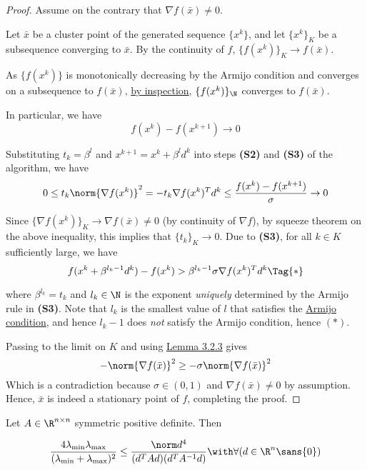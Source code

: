 \begin{proof}
  \def\xk{\{x^k\}}
  \def\grad#1{\nabla f(#1)}
  Assume on the contrary that $\grad{\bar x}\neq0$.

  Let $\bar x$ be a cluster point of the generated sequence $\xk$, and let
  $\xk_K$ be a subsequence converging to $\bar x$. By the continuity of $f$,
  $\{f(x^k)\}_K\to f(\bar x)$.

  As $\{f(x^k)\}$ is monotonically decreasing by the Armijo condition and
  converges on a subsequence to $f(\bar x)$, \href{aaf3ba6}{by inspection},
  $\{f(x^k)\}_\N$ converges to $f(\bar x)$.

  In particular, we have
  $$f(x^k)-f(x^{k+1})\to0$$

  Substituting $t_k=\beta^l$ and $x^{k+1}=x^k+\beta^ld^k$ into steps
  \textbf{(S2)} and \textbf{(S3)} of the algorithm, we have
  $$
    0\leq
    t_k\norm{\grad{x^k}}^2=
    -t_k\grad{x^k}^Td^k\leq
    \frac{f(x^k)-f(x^{k+1})}\sigma\to0
  $$

  Since $\{\grad{x^k}\}_K\to\grad{\bar x}\neq0$ (by continuity of $\nabla f$), by
  squeeze theorem on the above inequality, this implies that $\{t_k\}_K\to0$. Due
  to \textbf{(S3)}, for all $k\in K$ sufficiently large, we have
  \begin{equation*}
    f(x^k+\beta^{l_k-1}d^k)-f(x^k)>\beta^{l_k-1}\sigma\grad{x^k}^Td^k\Tag{*}
  \end{equation*}

  where $\beta^{l_k}=t_k$ and $l_k\in\N$ is the exponent \textit{uniquely}
  determined by the Armijo rule in \textbf{(S3)}. Note that $l_k$ is the smallest
  value of $l$ that satisfies the \href{fefb024}{Armijo condition}, and hence
  $l_k-1$ does \textit{not} satisfy the Armijo condition, hence $(*)$.

  Passing to the limit on $K$ and using \href{f8e1f12}{Lemma 3.2.3} gives
  $$
    -\norm{\nabla f(\bar x)}^2\geq-\sigma\norm{\nabla f(\bar x)}^2
  $$
  Which is a contradiction because $\sigma\in(0,1)$ and $\nabla f(\bar
  x)\neq0$ by assumption. Hence, $\bar x$ is indeed a stationary point
  of $f$, completing the proof.
\end{proof}

\label{eb4e630}

Let $A\in\R^{n\times n}$ symmetric positive definite. Then

\begin{equation*}
  \def\l{\lambda_{\min}}\def\L{\lambda_{\max}}
  \frac{4\l\L}{(\l+\L)^2}\leq\frac{\norm d^4}{(d^TAd)(d^TA^{-1}d)}
  \with\forall(d\in\R^n\sans{0})
\end{equation*}

